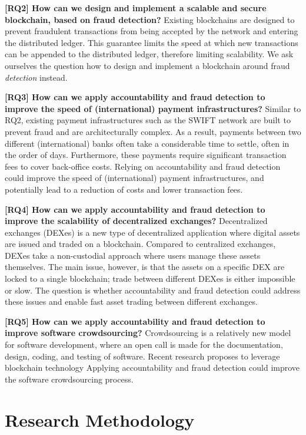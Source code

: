 \textbf{[RQ2] How can we design and implement a scalable and secure blockchain, based on fraud detection?}
Existing blockchains are designed to prevent fraudulent transactions from being accepted by the network and entering the distributed ledger.
This guarantee limits the speed at which new transactions can be appended to the distributed ledger, therefore limiting scalability.
We ask ourselves the question how to design and implement a blockchain around fraud \emph{detection} instead.

\textbf{[RQ3] How can we apply accountability and fraud detection to improve the speed of (international) payment infrastructures?}
Similar to RQ2, existing payment infrastructures such as the SWIFT network are built to prevent fraud and are architecturally complex.
As a result, payments between two different (international) banks often take a considerable time to settle, often in the order of days.
Furthermore, these payments require significant transaction fees to cover back-office costs.
Relying on accountability and fraud detection could improve the speed of (international) payment infrastructures, and potentially lead to a reduction of costs and lower transaction fees.

\textbf{[RQ4] How can we apply accountability and fraud detection to improve the scalability of decentralized exchanges?}
Decentralized exchanges (DEXes) is a new type of decentralized application where digital assets are issued and traded on a blockchain.
Compared to centralized exchanges, DEXes take a non-custodial approach where users manage these assets themselves.
The main issue, however, is that the assets on a specific DEX are locked to a single blockchain; trade between different DEXes is either impossible or slow.
The question is whether accountability and fraud detection could address these issues and enable fast asset trading between different exchanges.

\textbf{[RQ5] How can we apply accountability and fraud detection to improve software crowdsourcing?}
Crowdsourcing is a relatively new model for software development, where an open call is made for the documentation, design, coding, and testing of software.
Recent research proposes to leverage blockchain technology
Applying accountability and fraud detection could improve the software crowdsourcing process.

\section{Research Methodology}

